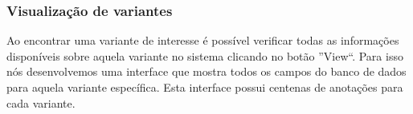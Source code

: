 % 
% 
% 

\subsubsection{Visualização de variantes}

Ao encontrar uma variante de interesse é possível verificar todas as informações disponíveis sobre aquela variante no sistema clicando no botão ''View``. Para isso nós desenvolvemos uma interface que mostra todos os campos do banco de dados para aquela variante específica. Esta interface possui centenas de anotações para cada variante.

